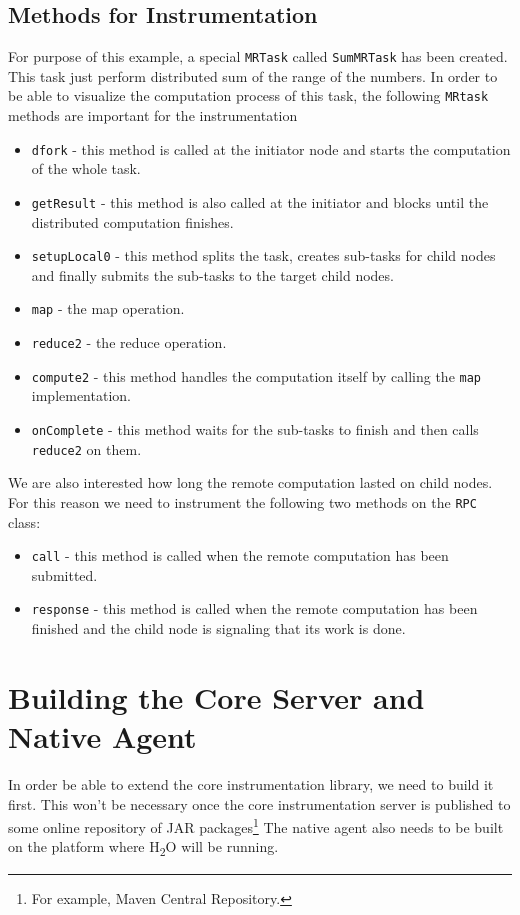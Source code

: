 \subsection{Methods for Instrumentation}
For purpose of this example, a special \texttt{MRTask} called \texttt{SumMRTask} has been created. This task just perform distributed sum of the range of the numbers. In order to be able to visualize the computation process of this task, the following \texttt{MRtask} methods are important for the instrumentation
\begin{itemize}
	\item \texttt{dfork} - this method is called at the initiator node and starts the computation of the whole task.
	\item \texttt{getResult} - this method is also called at the initiator and blocks until the distributed computation finishes.
	\item \texttt{setupLocal0} - this method splits the task, creates sub-tasks for child nodes and finally submits the sub-tasks to the target child nodes.
	\item \texttt{map} - the map operation.
	\item \texttt{reduce2} - the reduce operation.
	\item \texttt{compute2} - this method handles the computation itself by calling the \texttt{map} implementation.
	\item \texttt{onComplete} - this method waits for the sub-tasks to finish and then calls \texttt{reduce2} on them.
\end{itemize}

We are also interested how long the remote computation lasted on child nodes. For this reason we need to instrument the following two methods on the \texttt{RPC} class:
\begin{itemize}
	\item \texttt{call} - this method is called when the remote computation has been submitted.
	\item \texttt{response} - this method is called when the remote computation has been finished and the child node is signaling that its work is done.
\end{itemize}

\section{Building the Core Server and Native Agent}
In order be able to extend the core instrumentation library, we need to build it first. This won't be necessary once the core instrumentation server is published to some online repository of JAR packages\footnote{For example, Maven Central Repository.} The native agent also needs to be built on the platform where H\textsubscript{2}O will be running. 

